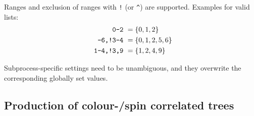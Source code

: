 Ranges and exclusion of ranges with \texttt{!} (or \texttt{\^}) are supported.
Examples for valid lists:
\begin{align*}
    \text{\texttt{0-2}         }     &= \{0,1,2\} \\
    \text{\texttt{-6,!3-4}         }  &   = \{0,1,2,5,6\} \\
    \text{\texttt{ 1-4,!3,9}       }   &   = \{1,2,4,9\}
\end{align*}

Subprocess-specific settings need to be unambiguous, and they overwrite 
the corresponding globally set values.

\subsection{Production of colour-/spin correlated trees}

